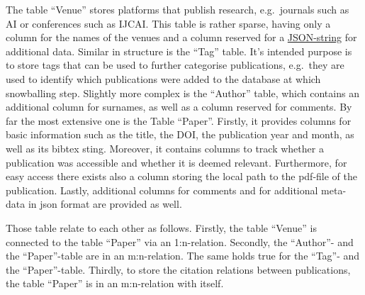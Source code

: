 \documentclass[11pt,a4paper]{book}
\theoremstyle{definition}
\theoremstyle{definition}
\theoremstyle{definition}
\theoremstyle{remark}
\begin{document}
The table ``Venue'' stores platforms that publish research, e.g.\ journals such as AI or conferences such as IJCAI. This table is rather sparse, having only a column for the names of the venues and a column reserved for a \href{https://www.json.org/json-en.html}{JSON-string} for additional data. 
Similar in structure is the ``Tag'' table. It's intended purpose is to store tags that can be used to further categorise publications, e.g.\ they are used to identify which publications were added to the database at which snowballing step.
Slightly more complex is the ``Author'' table, which contains an additional column for surnames, as well as a column reserved for comments. 
By far the most extensive one is the Table ``Paper''. 
Firstly, it provides columns for basic information such as the title, the DOI, the publication year and month, as well as its bibtex sting.
Moreover, it contains columns to track whether a publication was accessible and whether it is deemed relevant. 
Furthermore, for easy access there exists also a column storing the local path to the pdf-file of the publication.
Lastly, additional columns for comments and for additional meta-data in json format are provided as well.


Those table relate to each other as follows. 
Firstly, the table ``Venue'' is connected to the table ``Paper'' via an 1:n-relation.
Secondly, the ``Author''- and the ``Paper''-table are in an m:n-relation. The same holds true for the ``Tag''- and the ``Paper''-table.
Thirdly, to store the citation relations between publications, the table ``Paper'' is in an m:n-relation with itself.
\end{document}
